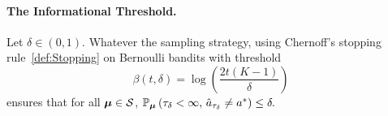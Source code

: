 \documentclass{colt2016} %
\begin{document}
\paragraph{The Informational Threshold.}
\begin{theorem}\label{prop:deltaPAC} 
Let $\delta \in (0,1)$. Whatever the sampling strategy, using Chernoff's stopping rule~\eqref{def:Stopping} on Bernoulli bandits with threshold 
\[\beta(t,\delta) = \log \left(\frac{2t (K-1)}{\delta}\right)\]
ensures that for all $\bm\mu \in \mathcal{S}$, $\mathbb{P}_{\bm\mu}\left(\tau_\delta<\infty, \,\hat{a}_{\tau_\delta} \neq a^*\right) \leq \delta.$
\end{theorem}
\end{document}
